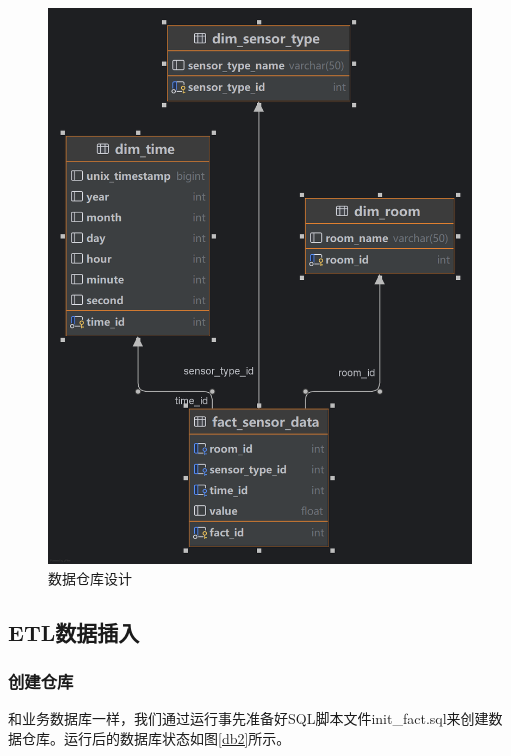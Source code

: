 \begin{figure}[!htbp]
    \centering
    \includegraphics[width=\textwidth]{images/data.png}
    \caption{数据仓库设计}\label{data}
\end{figure}

\subsection{ETL数据插入}
\subsubsection{创建仓库}
和业务数据库一样，我们通过运行事先准备好SQL脚本文件init\_fact.sql来创建数据仓库。运行后的数据库状态如图\ref{db2}所示。

